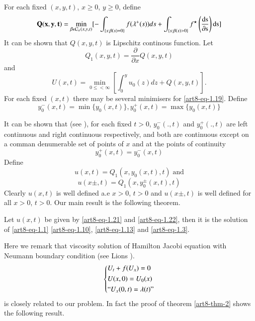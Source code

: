 For each fixed $(x,y,t)$, $x \geq 0$, $y\geq 0$, define
\begin{equation}\label{art8-eq-1.17}
\mathbf{Q}(\mathbf{x}, \mathbf{y}, \mathbf{t}) = \min\limits_{\beta \epsilon \mathcal{C}_{\alpha}(x,y,t)}[-\int_{\{s:\beta(s)=0\}} f(\lambda^{+}(s))ds + \int_{\{s:\beta(s)>0\}}f^{\star}\left(\dfrac{\rm{ds}}{\partial{\rm s}}\right){\rm ds}]
\end{equation}
It can be shown that $Q(x,y,t)$ is Lipschitz continous function. Let
\begin{equation}\label{art8-eq-1.18}
Q_{1}(x,y,t)= \dfrac{\partial}{\partial x}Q(x,y,t)
\end{equation} 
and
\begin{equation}\label{art8-eq-1.19}
U(x, t) = \min\limits_{0 \leq < \infty}\left[\int_{0}^{y}u_{0}(z)dz + Q(x,y,t)\right].
\end{equation}
For each fixed $(x,t)$ there may be several minimisers for \eqref{art8-eq-1.19}. Define
\begin{equation}\label{art8-eq-1.20}
y_{0}^{-}(x, t) =\min\{y_{0}(x,t)\}, y_{0}^{+}(x,t)=\max\{y_{0}(x,t)\}
\end{equation}

It can be shown  that (see \cite{art8-key5}), for each fixed $t> 0$, $y_{0}^{-}(.,t)$ and $y_{0}^{+}(.,t)$ are left continuous and right continuous respectively, and both are continuous except on a comman denumerable set of points of $x$ and at the points of continuity
$$
y_{0}^{+}(x, t)= y_{0}^{-}(x,t)
$$ 
Define
\begin{equation}\label{art8-eq-1.21}
u(x,t)=Q_{1}(x, y_{0}(x,t),t)\; \text{and}
\end{equation}
\begin{equation}\label{art8-eq-1.22}
u(x \pm, t) =Q_{1}(x,y_{0}^{\pm}(x,t),t)
\end{equation}
Clearly $u(x,t)$ is well defined a.e $x>0$, $t>0$ and $u(x\pm, t)$ is well defined for all $x>0$, $t>0$. Our main result is the following theorem.

\begin{theorem}\label{art8-thm-2}
Let $u(x,t)$ be given by \eqref{art8-eq-1.21} and \eqref{art8-eq-1.22}, then it is the solution of \eqref{art8-eq-1.1}
\eqref{art8-eq-1.10}, \eqref{art8-eq-1.13} and \eqref{art8-eq-1.3}. 
\end{theorem}
 Here we remark that viscosity solution of Hamilton Jacobi equation with Neumann boundary condition (see Lions \cite{art8-key11, art8-key12}).
 \begin{equation}\label{art8-eq-1.23}
 \left\{
\begin{aligned}
&U_{t}+ f(U_{x})=0\\
&U(x, 0) =U_{0}(x)\\
&``U_{x}(0,t)= \lambda(t)"
\end{aligned}
\right.
 \end{equation}
is closely related to our problem. In fact the proof of theorem \ref{art8-thm-2} shows the following result.

